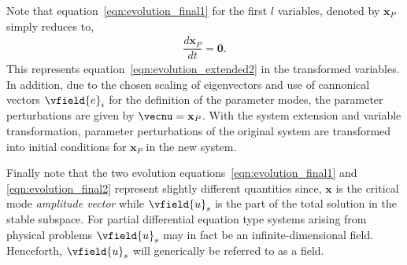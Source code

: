  Note that equation~\eqref{eqn:evolution_final1} for the first $l$ variables, denoted  by $\mathbf{x}_{P}$ simply reduces to,
 \begin{eqnarray} 	
 	\dfrac{d \mathbf{x}_{P}}{d t} = \mathbf{0}. \label{eqn:evolution_xp}
 \end{eqnarray}
This represents equation~\eqref{eqn:evolution_extended2} in the transformed variables. In addition, due to the chosen scaling of eigenvectors and use of cannonical vectors $\vfield{e}_{i}$ for the definition of the parameter modes, the parameter perturbations are given by $\vecnu = \mathbf{x}_{P}$. With the system extension and variable transformation, parameter perturbations of the original system are transformed into initial conditions for $\mathbf{x}_{P}$ in the new system.

Finally note that the two evolution equations~\eqref{eqn:evolution_final1} and \eqref{eqn:evolution_final2} represent slightly different quantities since, $\mathbf{x}$ is the critical mode \emph{amplitude vector} while $\vfield{u}_{s}$ is the part of the total solution in the stable subspace. For partial differential equation type systems arising from physical problems $\vfield{u}_{s}$ may in fact be an infinite-dimensional field. Henceforth, $\vfield{u}_{s}$ will generically be referred to as a field. 

